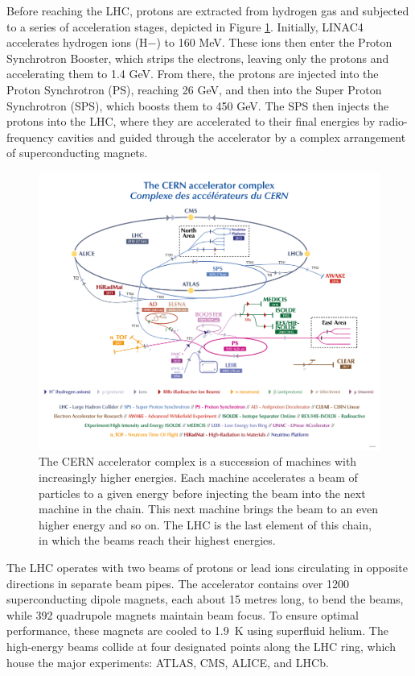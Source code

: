 Before reaching the LHC, protons are extracted from hydrogen gas and subjected to a series of acceleration stages, depicted in Figure \ref{fig:LHC_scheme}\cite{Lopienska:2800984}. Initially, LINAC4 accelerates hydrogen ions (H−) to 160 MeV. These ions then enter the Proton Synchrotron Booster, which strips the electrons, leaving only the protons and accelerating them to 1.4 GeV. From there, the protons are injected into the Proton Synchrotron (PS), reaching 26 GeV, and then into the Super Proton Synchrotron (SPS), which boosts them to 450 GeV. The SPS then injects the protons into the LHC, where they are accelerated to their final energies by radio-frequency cavities and guided through the accelerator by a complex arrangement of superconducting magnets.
\begin{figure}[ht]
    \centering
    \includegraphics[width=\textwidth]{figures/CCC-v2022-large.png}
    \caption{The CERN accelerator complex is a succession of machines with increasingly higher energies. Each machine accelerates a beam of particles to a given energy before injecting the beam into the next machine in the chain. This next machine brings the beam to an even higher energy and so on. The LHC is the last element of this chain, in which the beams reach their highest energies.}
    \label{fig:LHC_scheme}
\end{figure}
The LHC operates with two beams of protons or lead ions circulating in opposite directions in separate beam pipes. The accelerator contains over 1200 superconducting dipole magnets, each about 15 metres long, to bend the beams, while 392 quadrupole magnets maintain beam focus. To ensure optimal performance, these magnets are cooled to \SI{1.9}{\kelvin} using superfluid helium. The high-energy beams collide at four designated points along the LHC ring, which house the major experiments: ATLAS, CMS, ALICE, and LHCb.

